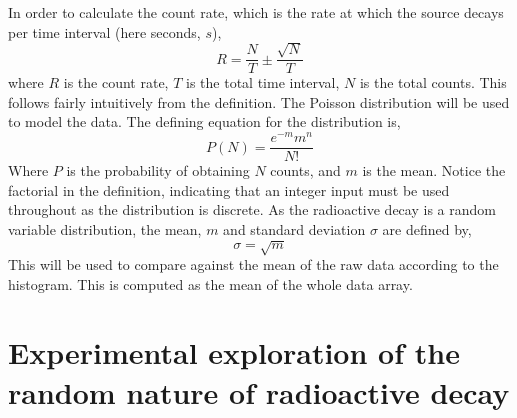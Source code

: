 \documentclass[11pt]{article}
\begin{document}
   \\
   \\
   In order to calculate the count rate, which is the rate at which the source decays per time interval (here seconds, $s$), 
  \begin{equation} 
  R = \frac{N}{T} \pm \frac{\sqrt{N}}{T}
   \end{equation}
   where $R$ is the count rate, $T$ is the total time interval, $N$ is the total counts. This follows fairly intuitively from the definition. 
    The Poisson distribution will be used to model the data. The defining equation for the distribution is, 
    \begin{equation}
        P(N) = \frac{e^{-m}m^{n}}{N!}
    \end{equation}
    Where $P$ is the probability of obtaining $N$ counts, and $m$ is the mean. Notice the factorial in the definition, indicating that an integer input must be used throughout as the distribution is discrete. 
    As the radioactive decay is a random variable distribution, the mean, $m$ and standard deviation $\sigma$ are defined by,
    \begin{equation}
        \sigma = \sqrt{m}
    \end{equation}
    This will be used to compare against the mean of the raw data according to the histogram. This is computed as the mean of the whole data array. 
     \newline 
    \section{Experimental exploration of the random nature of radioactive decay}
\end{document}
